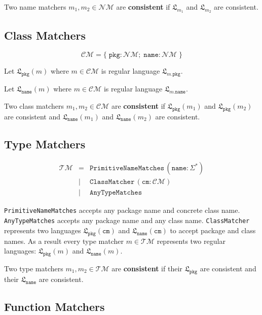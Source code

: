 \documentclass{article}
\newcommand{\lang}{\mathfrak{L}}
\begin{document}
\noindent Two name matchers $m_1, m_2 \in \mathcal{NM}$ are \textbf{consistent} if $\lang_{m_1}$ and $\lang_{m_2}$ are consistent.

\subsection{Class Matchers}

\[
\mathcal{CM} = \{\;\texttt{pkg} : \mathcal{NM};\; \texttt{name} : \mathcal{NM}\;\}
\]

Let $\lang_\texttt{pkg}(m)$ where $m \in \mathcal{CM}$ is regular language $\lang_{m.\texttt{pkg}}$.

Let $\lang_\texttt{name}(m)$ where $m \in \mathcal{CM}$ is regular language $\lang_{m.\texttt{name}}$.

\noindent Two class matchers $m_1, m_2 \in \mathcal{CM}$ are \textbf{consistent} if $\lang_\texttt{pkg}(m_1)$ and $\lang_\texttt{pkg}(m_2)$ are consistent and $\lang_\texttt{name}(m_1)$ and $\lang_\texttt{name}(m_2)$ are consistent.

\subsection{Type Matchers}
\[
\begin{array}{rcll}
\mathcal{TM} & =    & \texttt{PrimitiveNameMatches}\,(\texttt{name} : \Sigma^*) \\
             & \mid & \texttt{ClassMatcher}\,(\texttt{cm} : \mathcal{CM}) \\
             & \mid & \texttt{AnyTypeMatches}
\end{array}
\]

\texttt{PrimitiveNameMatches} accepts any package name and concrete class name. \texttt{AnyTypeMatches} accepts any package name and any class name. \texttt{ClassMatcher} represents two languages $\lang_\texttt{pkg}(\texttt{cm})$ and $\lang_\texttt{name}(\texttt{cm})$ to accept package and class names. As a result every type matcher $m \in \mathcal{TM}$ represents two regular languages: $\lang_\texttt{pkg}(m)$ and $\lang_\texttt{name}(m)$.

Two type matchers $m_1, m_2 \in \mathcal{TM}$ are \textbf{consistent} if their $\lang_\texttt{pkg}$ are consistent and their $\lang_\texttt{name}$ are consistent.

\subsection{Function Matchers}
\end{document}
